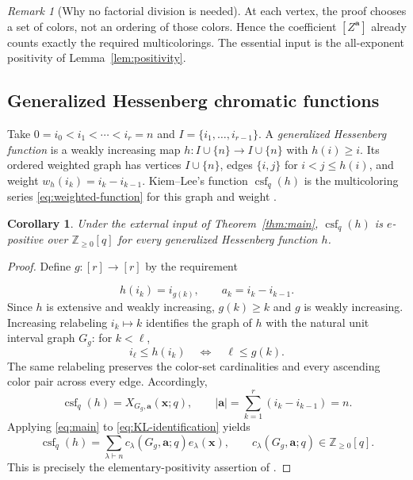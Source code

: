 \documentclass[11pt]{article}
\newtheorem{corollary}[theorem]{Corollary}
\theoremstyle{remark}
\newtheorem{remark}[theorem]{Remark}
\newcommand{\NN}{\mathbb Z_{\geq 0}}
\newcommand{\xx}{\mathbf x}
\newcommand{\avec}{\mathbf a}
\DeclareMathOperator{\csf}{csf}
\numberwithin{equation}{section}
\begin{document}
\begin{remark}[Why no factorial division is needed]
At each vertex, the proof chooses a set of colors, not an ordering of
those colors. Hence the coefficient $[Z^{\avec}]$ already counts exactly
the required multicolorings. The essential input is the all-exponent
positivity of Lemma~\ref{lem:positivity}.
\end{remark}

\subsection{Generalized Hessenberg chromatic functions}
Take $0=i_0<i_1<\cdots<i_r=n$ and
$I=\{i_1,\ldots,i_{r-1}\}$. A \emph{generalized Hessenberg function}
is a weakly increasing map $h:I\cup\{n\}\to I\cup\{n\}$ with
$h(i)\geq i$. Its ordered weighted graph has vertices $I\cup\{n\}$,
edges $\{i,j\}$ for $i<j\leq h(i)$, and weight
$w_h(i_k)=i_k-i_{k-1}$. Kiem--Lee's function
$\csf_q(h)$ is the multicoloring series \eqref{eq:weighted-function}
for this graph and weight \cite[Definitions~2.1 and~4.3]{KL}.

\begin{corollary}\label{cor:KL}
Under the external input of Theorem~\ref{thm:main}, $\csf_q(h)$ is
$e$-positive over $\NN[q]$ for every generalized Hessenberg function $h$.
\end{corollary}
\begin{proof}
Define $g:[r]\to[r]$ by the requirement

\begin{equation}\label{eq:relabel}
 h(i_k)=i_{g(k)},\qquad a_k=i_k-i_{k-1}.
\end{equation}
Since $h$ is extensive and weakly increasing, $g(k)\geq k$ and
$g$ is weakly increasing. Increasing relabeling $i_k\mapsto k$
identifies the graph of $h$ with the natural unit interval graph $G_g$:
for $k<\ell$,
\[
 i_\ell\leq h(i_k)
 \quad\Longleftrightarrow\quad
 \ell\leq g(k).
\]
The same relabeling preserves the color-set cardinalities and every
ascending color pair across every edge. Accordingly,
\begin{equation}\label{eq:KL-identification}
 \csf_q(h)=X_{G_g,\avec}(\xx;q),\qquad
 |\avec|=\sum_{k=1}^r(i_k-i_{k-1})=n.
\end{equation}
Applying \eqref{eq:main} to \eqref{eq:KL-identification} yields
\[
 \csf_q(h)=\sum_{\lambda\vdash n}
       c_\lambda(G_g,\avec;q)e_\lambda(\xx),
 \qquad c_\lambda(G_g,\avec;q)\in\NN[q].
\]
This is precisely the elementary-positivity assertion of
\cite[Question~4.9]{KL}.
\end{proof}
\end{document}
